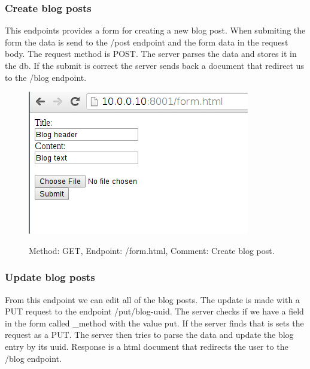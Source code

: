 \documentclass[a4paper,12pt]{article} %
\begin{document}
{\subsubsection{Create blog posts}

This endpoints provides a form for creating a new blog post.
When submiting the form the data is send to the /post endpoint and the form data in the request
body. The request method is POST.
The server parses the data and stores it in the db.
If the submit is correct the server sends back a document that redirect us to the /blog endpoint.

\begin{figure}[H]
    \centering  
    \includegraphics[scale=0.6]{img/screenshots/createblogpost.png}
	\label{fig:updateblogpost}
	\caption{Method: GET, Endpoint: /form.html, Comment: Create blog post.}
\end{figure}


\subsubsection{Update blog posts}

From this endpoint we can edit all of the blog posts.
The update is made with a PUT request to the endpoint /put/{blog-uuid}.
The server checks if we have a field in the form called \_method with the value put.
If the server finds that is sets the request as a PUT.
The server then tries to parse the data and update the blog entry by its uuid.
Response is a html document that redirects the user to the /blog endpoint.

}
\end{document}
